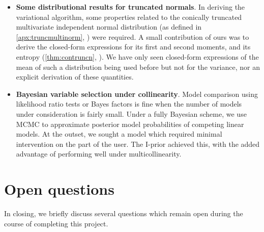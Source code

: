 \documentclass[11pt,twoside,openright]{report}
\begin{document}
\begin{itemize}
  \item \textbf{Some distributional results for truncated normals}. 
  In deriving the variational algorithm, some properties related to the conically truncated multivariate independent normal distribution (as defined in \cref{apx:truncmultinorm}, ) were required.
  A small contribution of ours was to derive the closed-form expressions for its first and second moments, and its entropy (\cref{thm:contruncn}, ).
  We have only seen closed-form expressions of the mean of such a distribution being used before \citep{girolami2006variational} but not for the variance, nor an explicit derivation of these quantities.
    
  \item \textbf{Bayesian variable selection under collinearity}. 
  Model comparison using likelihood ratio tests or Bayes factors is fine when the number of models under consideration is fairly small.
  Under a fully Bayesian scheme, we use MCMC to approximate posterior model probabilities of competing linear models.
  At the outset, we sought a model which required minimal intervention on the part of the user.
  The I-prior achieved this, with the added advantage of performing well under multicollinearity.
  
\end{itemize}

\section{Open questions}

In closing, we briefly discuss several questions which remain open during the course of completing this project.
\end{document}
